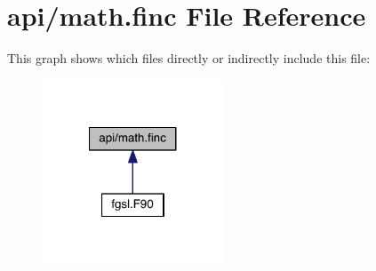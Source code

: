 \hypertarget{math_8finc}{\section{api/math.finc File Reference}
\label{math_8finc}
}
This graph shows which files directly or indirectly include this file\-:
\nopagebreak
\begin{figure}[H]
\begin{center}
\leavevmode
\includegraphics[width=152pt]{math_8finc__dep__incl}
\end{center}
\end{figure}
